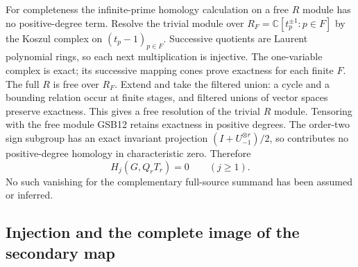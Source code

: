 For completeness the infinite-prime homology calculation on a free
$R$ module has no positive-degree term. Resolve the trivial module
over $R_F=\mathbb C[t_p^{\pm1}:p\in F]$ by the Koszul complex on
$(t_p-1)_{p\in F}$. Successive quotients are Laurent polynomial
rings, so each next multiplication is injective. The one-variable
complex is exact; its successive mapping cones prove exactness for
each finite $F$. The full $R$ is free over $R_F$. Extend and take
the filtered union: a cycle and a bounding relation occur at finite
stages, and filtered unions of vector spaces preserve exactness.
This gives a free resolution of the trivial $R$ module. Tensoring
with the free module GSB12 retains exactness in positive degrees.
The order-two sign subgroup has an exact invariant projection
$(I+U_{-1}^{\otimes r})/2$, so contributes no positive-degree
homology in characteristic zero. Therefore
\begin{equation}\tag{GSB13}
H_j(G,Q_rT_r)=0\qquad(j\ge1).
\end{equation}
No such vanishing for the complementary full-source summand has
been assumed or inferred.

\subsection{Injection and the complete image of the secondary map}

